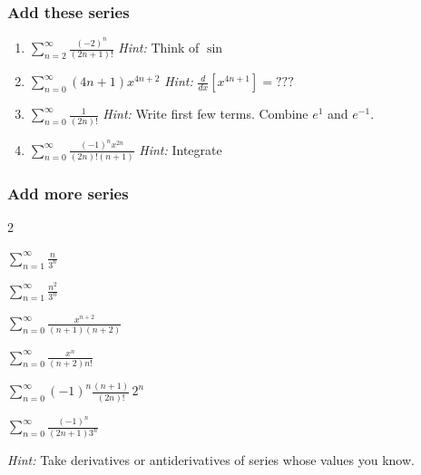 \begin{frame}[t]
	\fontsize{13}{13}\selectfont
	\frametitle{Add these series}

	\begin{enumerate}
		\item $\displaystyle \sum_{n=2}^{\infty}\frac{(-2)^{n}}{(2n+1)!}$ \hfill \emph{Hint:}
			Think of $\sin$

			\vfill

		\item $\displaystyle \sum_{n=0}^{\infty}(4n+1){x^{4n+2}}$ \hfill \emph{Hint:}
			$\displaystyle \frac{d}{dx}\left[ x^{4n+1}\right] = ???$

			\vfill

		\item $\displaystyle \sum_{n=0}^{\infty}\frac{1}{(2n)!}$ \hfill \emph{Hint:}
			Write first few terms. Combine $\displaystyle e^{1}$ and $\displaystyle e^{-1}$.

			\vfill

		\item $\displaystyle \sum_{n=0}^{\infty}\frac{(-1)^{n}x^{2n}}{(2n)!(n+1)}$ \hfill
			\emph{Hint:} Integrate %

			\vfill
	\end{enumerate}
\end{frame}

\begin{frame}[t]
	\frametitle{Add more series}
	\vspace{-.5cm}

	\begin{enumerate}
		\addtocounter{enumi}{4}
	\end{enumerate}
	\vspace{.5cm}

	\emph{Hint:} Take derivatives or antiderivatives of series whose values you
	know.
\end{frame}

